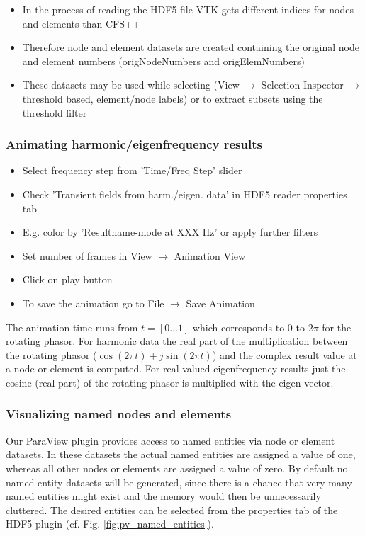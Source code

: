\begin{itemize}
\item In the  process of reading the HDF5 file VTK  gets different indices for
nodes and elements than CFS++
\item Therefore node and element  datasets are created containing the original
node and element numbers (origNodeNumbers and origElemNumbers)
\item These datasets may be used while selecting (View $\rightarrow$ Selection
Inspector $\rightarrow$  threshold based,  element/node labels) or  to extract
subsets using the threshold filter
\end{itemize}

\subsubsection{Animating harmonic/eigenfrequency results}

\begin{itemize}
\item Select frequency step from 'Time/Freq Step' slider
\item Check 'Transient fields from harm./eigen. data' in HDF5 reader properties tab
\item E.g. color by 'Resultname-mode at XXX Hz' or apply further filters
\item Set number of frames in View $\rightarrow$ Animation View
\item Click on play button
\item To save the animation go to File $\rightarrow$ Save Animation
\end{itemize}

The animation time runs from $t = [0\ldots1]$ which corresponds to 0 to $2\pi$
for the rotating phasor. For harmonic data the real part of the multiplication
between the rotating  phasor ($\cos(2\pi t) + j\sin(2\pi  t)$) and the complex
result value at a node or element is computed.  For real-valued eigenfrequency
results just the cosine (real part)  of the rotating phasor is multiplied with
the eigen-vector.


\subsubsection{Visualizing named nodes and elements}

Our  ParaView plugin provides  access to  named entities  via node  or element
datasets. In these datasets the actual  named entities are assigned a value of
one, whereas  all other  nodes or elements  are assigned  a value of  zero. By
default no  named entity datasets will  be generated, since there  is a chance
that  very many  named  entities might  exist  and the  memory  would then  be
unnecessarily  cluttered.   The desired  entities  can  be  selected from  the
properties tab of the HDF5 plugin (cf. Fig. \ref{fig:pv_named_entities}).

